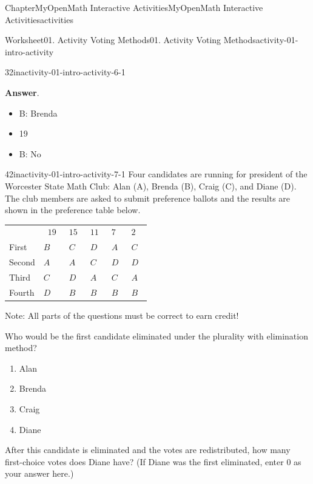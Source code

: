 \documentclass[oneside,10pt,]{book}
\newcommand{\blocktitlefont}{\relax}
\newcommand{\tabularfont}{\relax}
\newcommand{\ptxlistdisc}{\raisebox{0.3ex}{\textbullet}}
\begin{document}
\begin{chapterptx}{Chapter}{MyOpenMath Interactive Activities}{}{MyOpenMath Interactive Activities}{}{}{activities}
\begin{worksheet-section}{Worksheet}{01. Activity Voting Methods}{}{01. Activity Voting Methods}{}{}{activity-01-intro-activity}
\begin{divisionexercise}{3}{}{2in}{activity-01-intro-activity-6-1}
%
\par\smallskip%
\noindent\textbf{\blocktitlefont Answer}.\hypertarget{activity-01-intro-activity-6-1-2}{}\quad{}%
\begin{itemize}[label=\ptxlistdisc]
\item{}B: Brenda%
\item{}19%
\item{}B: No%
\end{itemize}
%
\end{divisionexercise}%
\clearpage
\begin{divisionexercise}{4}{}{2in}{activity-01-intro-activity-7-1}%
Four candidates are running for president of the Worcester State Math Club: Alan (A), Brenda (B), Craig (C), and Diane (D). The club members are asked to submit preference ballots and the results are shown in the preference table below.%
\begin{center}%
{\tabularfont%
\begin{tabular}{llllll}
 & \(\displaystyle{19}\) &\(\displaystyle{15}\) &\(\displaystyle{11}\) &\(\displaystyle{7}\) &\(\displaystyle{2}\) \tabularnewline[0pt]
First&\(\displaystyle{B}\) &\(\displaystyle{C}\) &\(\displaystyle{D}\) &\(\displaystyle{A}\) &\(\displaystyle{C}\) \tabularnewline[0pt]
Second&\(\displaystyle{A}\) &\(\displaystyle{A}\) &\(\displaystyle{C}\) &\(\displaystyle{D}\) &\(\displaystyle{D}\) \tabularnewline[0pt]
Third&\(\displaystyle{C}\) &\(\displaystyle{D}\) &\(\displaystyle{A}\) &\(\displaystyle{C}\) &\(\displaystyle{A}\) \tabularnewline[0pt]
Fourth&\(\displaystyle{D}\) &\(\displaystyle{B}\) &\(\displaystyle{B}\) &\(\displaystyle{B}\) &\(\displaystyle{B}\) 
\end{tabular}
}%
\end{center}%
Note: All parts of the questions must be correct to earn credit!%
\par
Who would be the first candidate eliminated under the plurality with elimination method?%
\par
%
\begin{enumerate}[label={(\alph*)}]
\item{}Alan%
\item{}Brenda%
\item{}Craig%
\item{}Diane%
\end{enumerate}
%
\par
After this candidate is eliminated and the votes are redistributed, how many first-choice votes does Diane have? (If Diane was the first eliminated, enter 0 as your answer here.)%

\end{divisionexercise}
\end{worksheet-section}
\end{chapterptx}
\end{document}
